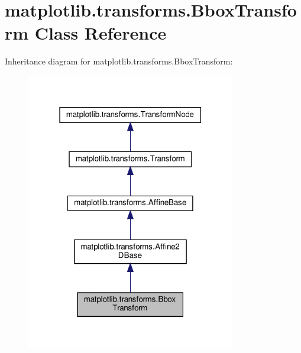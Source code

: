 \hypertarget{classmatplotlib_1_1transforms_1_1BboxTransform}{}\section{matplotlib.\+transforms.\+Bbox\+Transform Class Reference}
\label{classmatplotlib_1_1transforms_1_1BboxTransform}


Inheritance diagram for matplotlib.\+transforms.\+Bbox\+Transform\+:
\nopagebreak
\begin{figure}[H]
\begin{center}
\leavevmode
\includegraphics[width=259pt]{classmatplotlib_1_1transforms_1_1BboxTransform__inherit__graph}
\end{center}
\end{figure}


